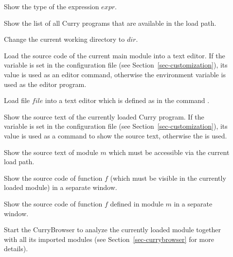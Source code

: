 \begin{description}
\item[]
Show the type of the expression $expr$.

\item[]
Show the list of all Curry programs that are available in the load path.

\item[]
Change the current working directory to $dir$.

\item[]
Load the source code of the current main module into a text editor.
If the variable  is set in the
configuration file 
(see Section~\ref{sec-customization}),
its value is used as an editor command, otherwise
the environment variable  is used as the editor program.

\item[]
Load file $file$ into a text editor which is defined
as in the command .

\item[]
Show the source text of the currently loaded Curry program.
If the variable  is set in the
configuration file 
(see Section~\ref{sec-customization}),
its value is used as a command to show the source text,
otherwise the  is used.

\item[]
Show the source text of module $m$ which must be accessible
via the current load path.

\item[]
Show the source code of function $f$ (which must be visible
in the currently loaded module) in a separate window.

\item[]
Show the source code of function $f$ defined in module $m$
in a separate window.

\item[]
Start the CurryBrowser to analyze the currently loaded
module together with all its imported modules
(see Section~\ref{sec-currybrowser} for more details).


\end{description}
